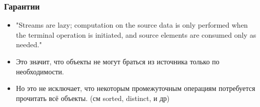 \begin{frame}
\frametitle{Гарантии} %
\begin{itemize}
	\item "Streams are lazy; computation on the source data is only performed when the terminal operation is initiated, and source elements are consumed only as needed."
	\item Это значит, что объекты не могут браться из источника только по необходимости. %
	\item Но это не исключает, что некоторым промежуточным операциям потребуется прочитать всё объекты. (см sorted, distinct, и др)
\end{itemize}

\end{frame}